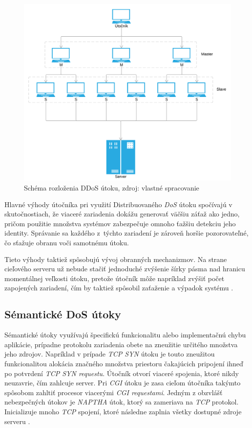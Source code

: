 \documentclass[
  printed, %
  table,   %
  lof,     %
  nolot,   %
  nocover
]{fithesis3}
\begin{document}
\begin{figure}[h]
  \centering
    \includegraphics[width=.98\textwidth]{images/ddos.png}
  \caption{Schéma rozloženia DDoS útoku, zdroj: vlastné spracovanie}
  \label{fig:ddos}
\end{figure}

Hlavné výhody útočníka pri využití Distribuovaného \textit{DoS} útoku
spočívajú v skutočnostiach, že viaceré zariadenia dokážu generovať väčšiu záťaž ako jedno,
pričom použitie množstva systémov zabezpečuje omnoho ťažšiu detekciu jeho identity. Správanie
sa každého z~týchto zariadení je zároveň horšie pozorovateľné, čo sťažuje obranu voči samotnému útoku.

Tieto výhody taktiež spôsobujú vývoj obranných mechanizmov. Na strane cieľového serveru už
nebude stačiť jednoduché zvýšenie šírky pásma nad hranicu momentálnej veľkosti útoku, pretože
útočník môže napríklad zvýšiť počet zapojených zariadení, čím by taktiež spôsobil zaťaženie a
výpadok systému \cite{Zargar:2013:DDoS}.

\subsection{Sémantické DoS útoky}
Sémantické útoky využívajú špecifickú funkcionalitu alebo implementačnú chybu aplikácie,
prípadne protokolu zariadenia obete na zneužitie určitého množstva jeho zdrojov. Napríklad
v prípade \textit{TCP SYN} útoku je touto zneužitou funkcionalitou alokácia značného množstva
priestoru čakajúcich pripojení ihneď po potvrdení \textit{ TCP SYN requestu}. Útočník otvorí
viaceré spojenia, ktoré nikdy neuzavrie, čím zahlcuje server. 
Pri \textit{CGI} útoku je zasa cieľom útočníka takýmto spôsobom zahltiť procesor viacerými
\textit{CGI requestami}.
Jedným z obzvlášť nebezpečných útokov je \textit{NAPTHA} útok, ktorý sa zameriava na
\textit{TCP} protokol. Inicializuje mnoho \textit{TCP} spojení, ktoré následne zaplnia všetky dostupné zdroje serveru \cite{Mirkovic:2004:DoS}.
\end{document}
